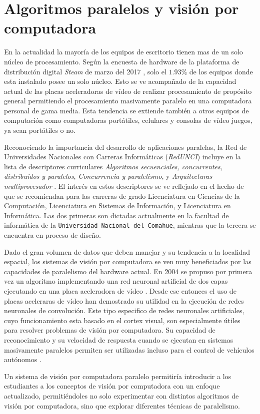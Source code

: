 
\section{Algoritmos paralelos y visión por computadora}

En la actualidad la mayoría de los equipos de escritorio tienen mas de un solo
núcleo de procesamiento. Según la encuesta de hardware de la plataforma de
distribución digital \emph{Steam} de marzo del 2017 \cite{steamSurvey}, solo
el $1.93$\% de los equipos donde esta instalado posee un solo núcleo. Esto se
ve acompañado de la capacidad actual de las placas aceleradoras de vídeo de
realizar procesamiento de propósito general permitiendo el procesamiento
masivamente paralelo en una computadora personal de gama media. Esta tendencia
se extiende también a otros equipos de computación como computadoras
portátiles, celulares y consolas de vídeo juegos, ya sean portátiles o no.

Reconociendo la importancia del desarrollo de aplicaciones paralelas, la Red
de Universidades Nacionales con Carreras Informáticas (\emph{RedUNCI}) incluye
en la lista de descriptores curriculares \emph{Algoritmos secuenciales,
concurrentes, distribuidos y paralelos}, \emph{Concurrencia y paralelismo}, y
\emph{Arquitecturas multiprocesador} \cite{RedUNCI2015}. El interés en estos
descriptores se ve reflejado en el hecho de que se recomiendan para las
carreras de grado Licenciatura en Ciencias de la Computación, Licenciatura en
Sistemas de Información, y Licenciatura en Informática. Las dos primeras son
dictadas actualmente en la facultad de informática de la \texttt{Universidad
Nacional del Comahue}, mientras que la tercera se encuentra en proceso de
diseño.

Dado el gran volumen de datos que deben manejar y su tendencia a la localidad
espacial, los sistemas de visión por computadora se ven muy beneficiados por
las capacidades de paralelismo del hardware actual. En 2004 se propuso por
primera vez un algoritmo implementando una red neuronal artificial de dos
capas ejecutando en una placa aceleradora de vídeo \cite{GPUforMLA}. Desde ese
entonces el uso de placas aceleraras de vídeo han demostrado su utilidad en la
ejecución de redes neuronales de convolución. Este tipo especifico de redes
neuronales artificiales, cuyo funcionamiento esta basado en el cortex visual,
son especialmente útiles para resolver problemas de visión por computadora. Su
capacidad de reconocimiento y su velocidad de respuesta cuando se ejecutan en
sistemas masivamente paralelos permiten ser utilizadas incluso para el control
de vehículos autónomos \cite{e2eLearning4SDC}.

Un sistema de visión por computadora paralelo permitiría introducir a los
estudiantes a los conceptos de visión por computadora con un enfoque
actualizado, permitiéndoles no solo experimentar con distintos algoritmos de
visión por computadora, sino que explorar diferentes técnicas de paralelismo.

